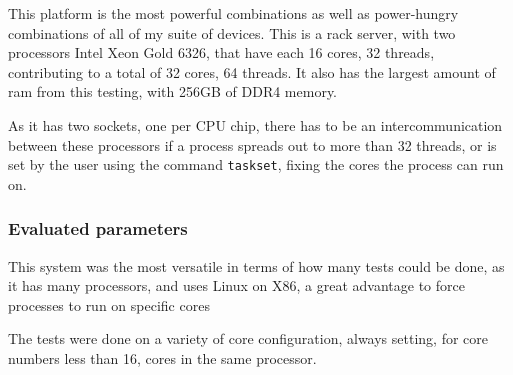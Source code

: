 This platform is the most powerful combinations as well as power-hungry combinations of all of my suite of devices. This is a rack server, with two processors Intel Xeon Gold 6326, that have each 16 cores, 32 threads, contributing to a total of 32 cores, 64 threads. It also has the largest amount of \gls{ram} from this testing, with 256GB of \gls{DDR4} memory.

As it has two sockets, one per CPU chip, there has to be an intercommunication between these processors if a process spreads out to more than 32 threads, or is set by the user using the command \texttt{taskset}, fixing the cores the process can run on.



\subsubsection{Evaluated parameters}
This system was the most versatile in terms of how many  tests could be done, as it has many processors, and uses Linux on X86, a great advantage to force processes to run on specific cores

The tests were done on a variety of core configuration, always setting, for core numbers less than 16, cores in the same processor. 

